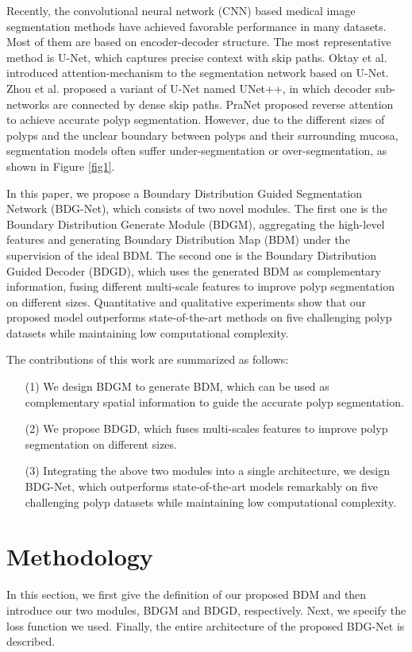 \documentclass[]{spie}
\begin{document}
Recently, the convolutional neural network (CNN) based medical image segmentation methods have achieved favorable performance in many datasets. Most of them are based on encoder-decoder structure. The most representative method is U-Net\cite{ronneberger2015u}, which captures precise context with skip paths. Oktay et al.\cite{oktay2018attention} introduced attention-mechanism to the segmentation network based on U-Net. Zhou et al.\cite{zhou2018unet++} proposed a variant of U-Net named UNet++, in which decoder sub-networks are connected by dense skip paths. PraNet\cite{fan2020pranet} proposed reverse attention to achieve accurate polyp segmentation.  However, due to the different sizes of polyps and the unclear boundary between polyps and their surrounding mucosa, segmentation models often suffer under-segmentation or over-segmentation, as shown in Figure \ref{fig1}. 

In this paper, we propose a Boundary Distribution Guided Segmentation Network (BDG-Net), which consists of two novel modules. The first one is the Boundary Distribution Generate Module (BDGM), aggregating the high-level features and generating Boundary Distribution Map (BDM) under the supervision of the ideal BDM. The second one is the Boundary Distribution Guided Decoder (BDGD), which uses the generated BDM as complementary information, fusing different multi-scale features to improve polyp segmentation on different sizes. Quantitative and qualitative experiments show that our proposed model outperforms state-of-the-art methods on five challenging polyp datasets while maintaining low computational complexity. 

The contributions of this work are summarized as follows: 
\begin{itemize}
    \item[(1)] We design BDGM to generate BDM, which can be used as complementary spatial information to guide the accurate polyp segmentation.
    \item[(2)] We propose BDGD, which fuses multi-scales features to improve polyp segmentation on different sizes.
    \item[(3)] Integrating the above two modules into a single architecture, we design BDG-Net, which outperforms state-of-the-art models remarkably on five challenging polyp datasets while maintaining low computational complexity.
\end{itemize} 


\section{Methodology}
In this section, we ﬁrst give the definition of our proposed BDM and then introduce our two modules, BDGM and BDGD, respectively. Next, we specify the loss function we used. Finally, the entire architecture of the proposed BDG-Net is described.
\end{document}
